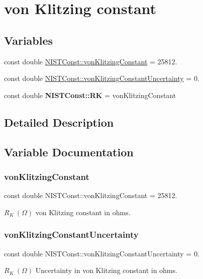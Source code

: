 \hypertarget{group__von_klitzing_constant}{}\section{von Klitzing constant}
\label{group__von_klitzing_constant}
\subsection*{Variables}
\begin{DoxyCompactItemize}
\item 
const double \hyperlink{group__von_klitzing_constant_ga664441cab64a6a8feda702f6354c1e7f}{N\+I\+S\+T\+Const\+::von\+Klitzing\+Constant} = 25812.
\item 
const double \hyperlink{group__von_klitzing_constant_ga8fa7b05f4ab4958f9bed81f592304e49}{N\+I\+S\+T\+Const\+::von\+Klitzing\+Constant\+Uncertainty} = 0.
\item 
\mbox{\label{group__von_klitzing_constant_ga49d5fad3e8e7b5800765ce47a748ebae}} 
const double {\bfseries N\+I\+S\+T\+Const\+::\+RK} = von\+Klitzing\+Constant
\end{DoxyCompactItemize}


\subsection{Detailed Description}


\subsection{Variable Documentation}
\mbox{\label{group__von_klitzing_constant_ga664441cab64a6a8feda702f6354c1e7f}} 
\subsubsection{\texorpdfstring{von\+Klitzing\+Constant}{vonKlitzingConstant}}
{\footnotesize\ttfamily const double N\+I\+S\+T\+Const\+::von\+Klitzing\+Constant = 25812.}

$R_K \ (\Omega)$ von Klitzing constant in ohms. \mbox{\label{group__von_klitzing_constant_ga8fa7b05f4ab4958f9bed81f592304e49}} 
\subsubsection{\texorpdfstring{von\+Klitzing\+Constant\+Uncertainty}{vonKlitzingConstantUncertainty}}
{\footnotesize\ttfamily const double N\+I\+S\+T\+Const\+::von\+Klitzing\+Constant\+Uncertainty = 0.}

$R_K \ (\Omega)$ Uncertainty in von Klitzing constant in ohms. 